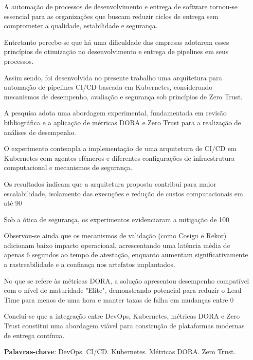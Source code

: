 A automação de processos de desenvolvimento e entrega de software tornou-se essencial para as organizações que buscam reduzir ciclos de entrega sem comprometer a qualidade, estabilidade e segurança.

Entretanto percebe-se que há uma dificuldade das empresas adotarem esses princípios de otimização no desenvolvimento e entrega de pipelines em seus processos.

Assim sendo, foi desenvolvida no presente trabalho uma arquitetura para automação de pipelines CI/CD baseada em Kubernetes, considerando mecanismos de desempenho, avaliação e segurança sob princípios de Zero Trust.

A pesquisa adota uma abordagem experimental, fundamentada em revisão bibliográfica e a aplicação de métricas DORA e Zero Trust para a realização de análises de desempenho.

O experimento contempla a implementação de uma arquitetura de CI/CD em Kubernetes com agentes efêmeros e diferentes configurações de infraestrutura computacional e mecanismos de segurança.

Os resultados indicam que a arquitetura proposta contribui para maior escalabilidade, isolamento das execuções e redução de custos computacionais em até 90%

Sob a ótica de segurança, os experimentos evidenciaram a mitigação de 100%

Observou-se ainda que os mecanismos de validação (como Cosign e Rekor) adicionam baixo impacto operacional, acrescentando uma latência média de apenas 6 segundos ao tempo de atestação, enquanto aumentam significativamente a rastreabilidade e a confiança nos artefatos implantados.

No que se refere às métricas DORA, a solução apresentou desempenho compatível com o nível de maturidade "Elite", demonstrando potencial para reduzir o Lead Time para menos de uma hora e manter taxas de falha em mudanças entre 0%

Conclui-se que a integração entre DevOps, Kubernetes, métricas DORA e Zero Trust constitui uma abordagem viável para construção de plataformas modernas de entrega contínua.

\textbf{Palavras-chave}: DevOps. CI/CD. Kubernetes. Métricas DORA. Zero Trust.
